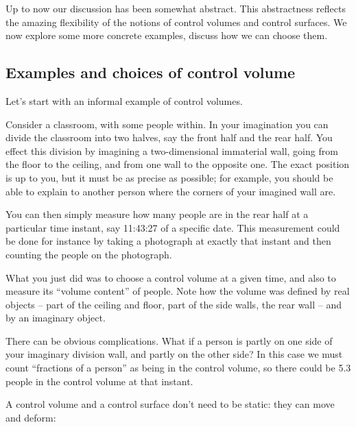 \documentclass[a4paper,12pt,%
onecolumn,oneside,%
british%
]{memoir}
\renewcommand*{\|}[1][]{\nonscript\:#1\vert\nonscript\:\mathopen{}}
\begin{document}
Up to now our discussion has been somewhat abstract. This abstractness reflects the amazing flexibility of the notions of control volumes and control surfaces. We now explore some more concrete examples, discuss how we can choose them.

\subsection{Examples and choices of control volume}
\label{sec:control_volumes}

Let's start with an informal example of control volumes.

Consider a classroom, with some people within. In your imagination you can divide the classroom into two halves, say the front half and the rear half. You effect this division by imagining a two-dimensional immaterial wall, going from the floor to the ceiling, and from one wall to the opposite one. The exact position is up to you, but it must be as precise as possible; for example, you should be able to explain to another person where the corners of your imagined wall are.

You can then simply measure how many people are in the rear half at a particular time instant, say 11:43:27 of a specific date. This measurement could be done for instance by taking a photograph at exactly that instant and then counting the people on the photograph.

What you just did was to choose a control volume at a given time, and also to measure its \enquote{volume content} of people. Note how the volume was defined by real objects -- part of the ceiling and floor, part of the side walls, the rear wall -- and by an imaginary object.

There can be obvious complications. What if a person is partly on one side of your imaginary division wall, and partly on the other side? In this case we must count \enquote{fractions of a person} as being in the control volume, so there could be \num{5.3} people in the control volume at that instant.



\medskip

A control volume and a control surface don't need to be static: they can move and deform:
\end{document}
